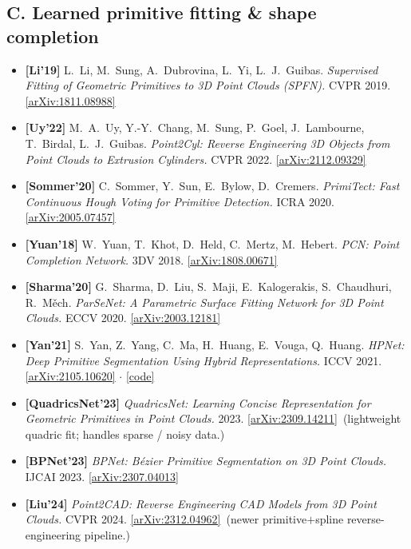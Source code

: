 \documentclass[10pt,a4paper]{article}
\begin{document}
{\subsection*{C. Learned primitive fitting \& shape completion}
\begin{itemize}[leftmargin=1.4em,itemsep=3pt,topsep=2pt]
  \item \textbf{[Li'19]} L.~Li, M.~Sung, A.~Dubrovina, L.~Yi, L.~J.~Guibas.
  \emph{Supervised Fitting of Geometric Primitives to 3D Point Clouds (SPFN).} CVPR 2019.
  \href{https://arxiv.org/abs/1811.08988}{[arXiv:1811.08988]}
  \item \textbf{[Uy'22]} M.~A.~Uy, Y.-Y.~Chang, M.~Sung, P.~Goel, J.~Lambourne, T.~Birdal,
  L.~J.~Guibas. \emph{Point2Cyl: Reverse Engineering 3D Objects from Point Clouds to
  Extrusion Cylinders.} CVPR 2022. \href{https://arxiv.org/abs/2112.09329}{[arXiv:2112.09329]}
  \item \textbf{[Sommer'20]} C.~Sommer, Y.~Sun, E.~Bylow, D.~Cremers. \emph{PrimiTect:
  Fast Continuous Hough Voting for Primitive Detection.} ICRA 2020.
  \href{https://arxiv.org/abs/2005.07457}{[arXiv:2005.07457]}
  \item \textbf{[Yuan'18]} W.~Yuan, T.~Khot, D.~Held, C.~Mertz, M.~Hebert. \emph{PCN: Point
  Completion Network.} 3DV 2018. \href{https://arxiv.org/abs/1808.00671}{[arXiv:1808.00671]}
  \item \textbf{[Sharma'20]} G.~Sharma, D.~Liu, S.~Maji, E.~Kalogerakis, S.~Chaudhuri,
  R.~M\v{e}ch. \emph{ParSeNet: A Parametric Surface Fitting Network for 3D Point Clouds.}
  ECCV 2020. \href{https://arxiv.org/abs/2003.12181}{[arXiv:2003.12181]}
  \item \textbf{[Yan'21]} S.~Yan, Z.~Yang, C.~Ma, H.~Huang, E.~Vouga, Q.~Huang. \emph{HPNet:
  Deep Primitive Segmentation Using Hybrid Representations.} ICCV 2021.
  \href{https://arxiv.org/abs/2105.10620}{[arXiv:2105.10620]}
  $\cdot$ \href{https://github.com/SimingYan/HPNet}{[code]}
  \item \textbf{[QuadricsNet'23]} \emph{QuadricsNet: Learning Concise Representation for
  Geometric Primitives in Point Clouds.} 2023.
  \href{https://arxiv.org/abs/2309.14211}{[arXiv:2309.14211]} \,(lightweight quadric fit;
  handles sparse / noisy data.)
  \item \textbf{[BPNet'23]} \emph{BPNet: B\'ezier Primitive Segmentation on 3D Point Clouds.}
  IJCAI 2023. \href{https://arxiv.org/abs/2307.04013}{[arXiv:2307.04013]}
  \item \textbf{[Liu'24]} \emph{Point2CAD: Reverse Engineering CAD Models from 3D Point
  Clouds.} CVPR 2024. \href{https://arxiv.org/abs/2312.04962}{[arXiv:2312.04962]}
  \,(newer primitive$+$spline reverse-engineering pipeline.)
\end{itemize}

}
\end{document}
